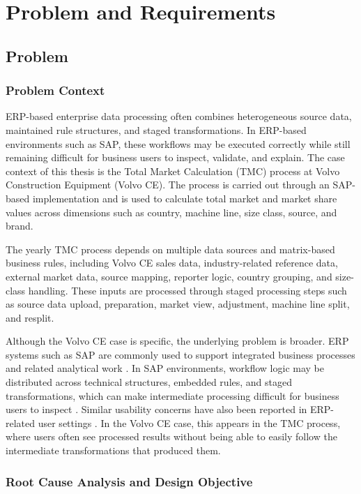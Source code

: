 

\chapter{Problem and Requirements} \label{cha:results}
\section{Problem}

\subsection{Problem Context}

ERP-based enterprise data processing often combines heterogeneous source data, maintained rule structures, and staged transformations. In ERP-based environments such as SAP, these workflows may be executed correctly while still remaining difficult for business users to inspect, validate, and explain. The case context of this thesis is the Total Market Calculation (TMC) process at Volvo Construction Equipment (Volvo CE). The process is carried out through an SAP-based implementation and is used to calculate total market and market share values across dimensions such as country, machine line, size class, source, and brand.

The yearly TMC process depends on multiple data sources and matrix-based business rules, including Volvo CE sales data, industry-related reference data, external market data, source mapping, reporter logic, country grouping, and size-class handling. These inputs are processed through staged processing steps such as source data upload, preparation, market view, adjustment, machine line split, and resplit.

Although the Volvo CE case is specific, the underlying problem is broader. ERP systems such as SAP are commonly used to support integrated business processes and related analytical work \cite{klaus2000}. In SAP environments, workflow logic may be distributed across technical structures, embedded rules, and staged transformations, which can make intermediate processing difficult for business users to inspect \cite{weber2022sap}. Similar usability concerns have also been reported in ERP-related user settings \cite{wong2016sap}. In the Volvo CE case, this appears in the TMC process, where users often see processed results without being able to easily follow the intermediate transformations that produced them.

\subsection{Root Cause Analysis and Design Objective}

